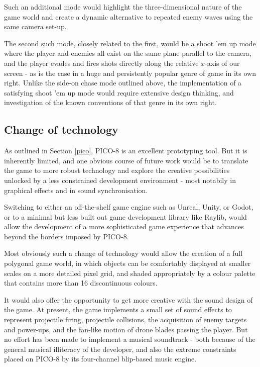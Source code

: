 \documentclass[11pt]{article}
\begin{document}
Such an additional mode would highlight the three-dimensional nature of the game world and
create a dynamic alternative to repeated enemy waves using the same camera set-up.

The second such mode, closely related to the first, would be a shoot 'em up mode where the player
and enemies all exist on the same plane parallel to the camera, and the player evades and fires shots
directly along the relative $x$-axis of our screen - as is the case in a huge and persistently popular
genre of game in its own right. Unlike the side-on chase mode outlined above, the implementation of
a satisfying shoot 'em up mode would require extensive design thinking, and investigation of the
known conventions of that genre in its own right.

\subsection{Change of technology}\label{engines}

As outlined in Section \ref{pico}, PICO-8 is an excellent prototyping tool. But it is inherently
limited, and one obvious course of future work would be to translate the game to more robust technology
and explore the creative possibilities unlocked by a less constrained development environment - most
notabily in graphical effects and in sound synchronisation.

Switching to either an off-the-shelf game engine such as Unreal, Unity, or Godot, or to a minimal but
less built out game development library like Raylib, would allow the development of a more sophisticated
game experience that advances beyond the borders imposed by PICO-8.

Most obviously such a change of technology would allow the creation of a full polygonal game world,
in which objects can be comfortably displayed at smaller scales on a more detailed pixel grid, and
shaded appropriately by a colour palette that contains more than 16 discontinuous colours.

It would also offer the opportunity to get more creative with the sound design of the game. At present,
the game implements a small set of sound effects to represent projectile firing, projectile collisions,
the acquisition of enemy targets and power-ups, and the fan-like motion of drone blades passing the player.
But no effort has been made to implement a musical soundtrack - both because of the general musical illiteracy
of the developer, and also the extreme constraints placed on PICO-8 by its four-channel blip-based
music engine.
\end{document}
